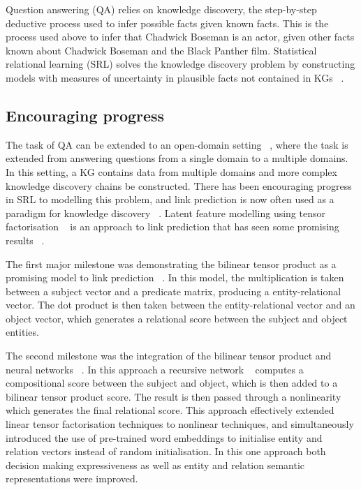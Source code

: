 \noindent Question answering (QA) relies on knowledge discovery, the step-by-step deductive process used to infer possible facts given known facts. This is the process used above to infer that Chadwick Boseman is an actor, given other facts known about Chadwick Boseman and the Black Panther film. Statistical relational learning (SRL) solves the knowledge discovery problem by constructing models with measures of uncertainty in plausible facts not contained in KGs \unskip~\citep{koller2007introduction}.\par

\subsection{Encouraging progress} 

The task of QA can be extended to an open-domain setting \unskip~\citep{chen2017reading}, where the task is extended from answering questions from a single domain to a multiple domains. In this setting, a KG contains data from multiple domains and more complex knowledge discovery chains be constructed. There has been encouraging progress in SRL to modelling this problem, and link prediction is now often used as a paradigm for knowledge discovery \unskip~\citep{kristiadi2019incorporating, ebisu2018toruse, nguyen2017novel}. Latent feature modelling using tensor factorisation \unskip~\citep{harshman1978models, kolda2009tensor} is an approach to link prediction that has seen some promising results \unskip~\citep{bordes2011learning, jenatton2012latent, nickel2016holographic}. \par 

\noindent The first major milestone was demonstrating the bilinear tensor product as a promising model to link prediction \unskip~\citep{nickel2011three}. In this model, the multiplication is taken between a subject vector and a predicate matrix, producing a entity-relational vector. The dot product is then taken between the entity-relational vector and an object vector, which generates a relational score between the subject and object entities. \par

\noindent The second milestone was the integration of the bilinear tensor product and neural networks \unskip~\citep{socher2013reasoning}. In this approach a recursive network \unskip~\citep{pollack1990recursive} computes a compositional score between the subject and object, which is then added to a bilinear tensor product score. The result is then passed through a nonlinearity which generates the final relational score. This approach effectively extended linear tensor factorisation techniques to nonlinear techniques, and simultaneously introduced the use of pre-trained word embeddings to initialise entity and relation vectors instead of random initialisation. In this one approach both decision making expressiveness as well as entity and relation semantic representations were improved. \par

